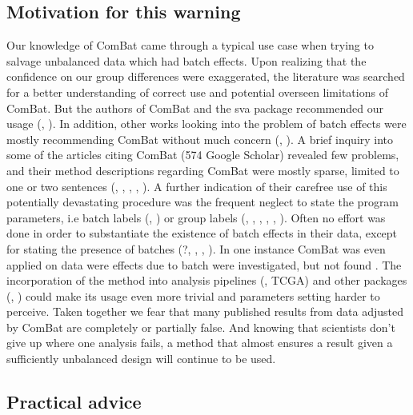 \documentclass{bio}
\begin{document}
\subsection{Motivation for this warning}

Our knowledge of ComBat came through a typical use case when trying to salvage unbalanced data which had batch effects. Upon realizing that the confidence on our group differences were exaggerated, the literature was searched for a better understanding of correct use and potential overseen limitations of ComBat. But the authors of ComBat and the sva package recommended our usage (\citealp{Johnson2007}, \citealp{Leek2012}). In addition, other works looking into the problem of batch effects were mostly recommending ComBat without much concern (\citealp{Kupfer2012}, \citealp{Kitchen2011}). A brief inquiry into  some of the articles citing ComBat (574 Google Scholar) revealed few problems, and their method descriptions regarding ComBat were mostly sparse, limited to one or two sentences (, , , , ). A further indication of their carefree use of this potentially devastating procedure was the frequent neglect to state the program parameters, i.e batch labels (, ) or group labels (, , , , , ). Often no effort was done in order to substantiate the existence of batch effects in their data, except for stating the presence of batches (?, , , ). In one instance ComBat was even applied on data were effects due to batch were investigated, but not found . The incorporation of the method into analysis pipelines (, TCGA) and other packages (, ) could make its usage even more trivial and parameters setting harder to perceive.
Taken together we fear that many published results from data adjusted by ComBat are completely or partially false. And knowing that scientists don't give up where one analysis fails, a method that almost ensures a result given a sufficiently unbalanced design will continue to be used.


\subsection{Practical advice}
\end{document}
